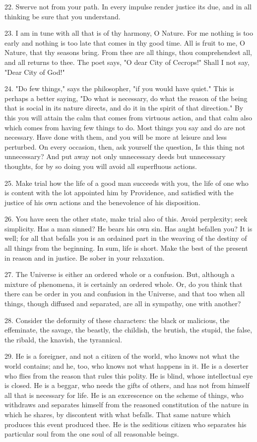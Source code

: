 \documentclass{book}
\begin{document}
22. Swerve not from your path. In every impulse render justice its
due, and in all thinking be sure that you understand.

23. I am in tune with all that is of thy harmony, O Nature. For me
nothing is too early and nothing is too late that comes in thy good
time. All is fruit to me, O Nature, that thy seasons bring. From thee
are all things, thou comprehendest all, and all returns to thee. The
poet says, "O dear City of Cecrops!" Shall I not say, "Dear City of
God!"

24. "Do few things," says the philosopher, "if you would have quiet."
This is perhaps a better saying, "Do what is necessary, do what the
reason of the being that is social in its nature directs, and do it in
the spirit of that direction." By this you will attain the calm that
comes from virtuous action, and that calm also which comes from having
few things to do. Most things you say and do are not necessary. Have
done with them, and you will be more at leisure and less perturbed. On
every occasion, then, ask yourself the question, Is this thing not
unnecessary? And put away not only unnecessary deeds but unnecessary
thoughts, for by so doing you will avoid all superfluous actions.

25. Make trial how the life of a good man succeeds with you, the life
of one who is content with the lot appointed him by Providence, and
satisfied with the justice of his own actions and the benevolence of
his disposition.

26. You have seen the other state, make trial also of this. Avoid
perplexity; seek simplicity. Has a man sinned? He bears his own
sin. Has aught befallen you? It is well; for all that befalls you is
an ordained part in the weaving of the destiny of all things from the
beginning. In sum, life is short. Make the best of the present in
reason and in justice. Be sober in your relaxation.

27. The Universe is either an ordered whole or a confusion. But,
although a mixture of phenomena, it is certainly an ordered whole. Or,
do you think that there can be order in you and confusion in the
Universe, and that too when all things, though diffused and separated,
are all in sympathy, one with another?

28. Consider the deformity of these characters: the black or
malicious, the effeminate, the savage, the beastly, the childish, the
brutish, the stupid, the false, the ribald, the knavish, the
tyrannical.

29. He is a foreigner, and not a citizen of the world, who knows not
what the world contains; and he, too, who knows not what happens in
it. He is a deserter who flies from the reason that rules this
polity. He is blind, whose intellectual eye is closed. He is a beggar,
who needs the gifts of others, and has not from himself all that is
necessary for life. He is an excrescence on the scheme of things, who
withdraws and separates himself from the reasoned constitution of the
nature in which he shares, by discontent with what befalls. That same
nature which produces this event produced thee. He is the seditious
citizen who separates his particular soul from the one soul of all
reasonable beings.
\end{document}
